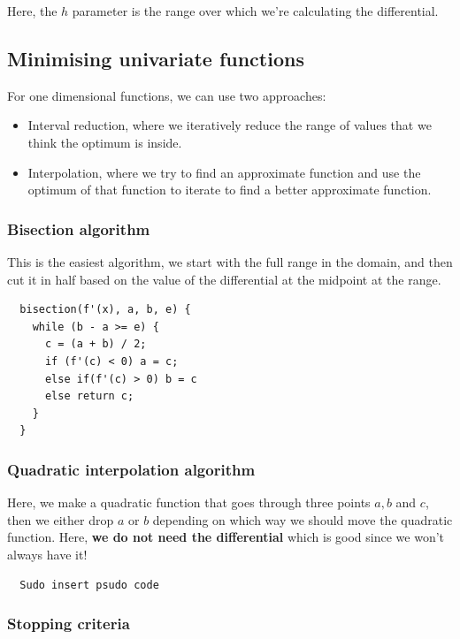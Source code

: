 Here, the $h$ parameter is the range over which we're calculating the
differential.

\subsection{Minimising univariate functions}

For one dimensional functions, we can use two approaches:

\begin{itemize}
  \item Interval reduction, where we iteratively reduce the range of values that
  we think the optimum is inside.
  \item Interpolation, where we try to find an approximate function and use the
  optimum of that function to iterate to find a better approximate function.
\end{itemize}

\subsubsection{Bisection algorithm}

This is the easiest algorithm, we start with the full range in the domain, and
then cut it in half based on the value of the differential at the midpoint at
the range.

\begin{verbatim}
  bisection(f'(x), a, b, e) {
    while (b - a >= e) {
      c = (a + b) / 2;
      if (f'(c) < 0) a = c;
      else if(f'(c) > 0) b = c
      else return c;
    }
  }
\end{verbatim}

\subsubsection{Quadratic interpolation algorithm}

Here, we make a quadratic function that goes through three points $a, b$ and
$c$, then we either drop $a$ or $b$ depending on which way we should move the
quadratic function. Here, \textbf{we do not need the differential} which is good
since we won't always have it!


\begin{verbatim}
  Sudo insert psudo code
\end{verbatim}

\subsubsection{Stopping criteria}


